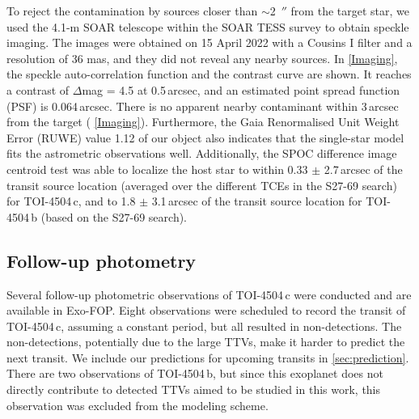 \documentclass[twocolumn,twocolappendix]{aastex631}
\let\orgautoref\autoref
\renewcommand{\autoref}
        {\def\equationautorefname{Eq.}%
         \def\figureautorefname{Fig.}%
         \def\sectionautorefname{Sect.}%
         \def\subsectionautorefname{Sect.}%
         \def\subsubsectionautorefname{Sect.}%
         \orgautoref}
\begin{document}
To reject the contamination by sources closer than $\sim$2 \,$''$ from the target star, we used the 4.1-m SOAR telescope \citep{SOAR} within the SOAR TESS survey \citep{SOAR_TESS} to obtain speckle imaging. The images were obtained on 15 April 2022 with a Cousins I filter and a resolution of 36 mas, and they did not reveal any nearby sources. In \autoref{Imaging}, the speckle auto-correlation function and the contrast curve are shown. It reaches a contrast of $\Delta$mag = 4.5 at 0.5\,arcsec, and an estimated point spread function (PSF) is 0.064\,arcsec. There is no apparent nearby contaminant within 3\,arcsec from the target (\autoref{Imaging}).
Furthermore, the Gaia Renormalised Unit Weight Error (RUWE) value 1.12 of our object also indicates that the single-star model fits the astrometric observations well.
Additionally, the SPOC difference image centroid test was able to localize the host star to within 0.33 $\pm$ 2.7\,arcsec of the transit source location (averaged over the different TCEs in the S27-69 search) for TOI-4504\,c, and to 1.8 $\pm$ 3.1\,arcsec of the transit source location for TOI-4504\,b (based on the S27-69 search).%

\subsection{Follow-up photometry}
Several follow-up photometric observations of TOI-4504\,c were conducted and are available in Exo-FOP. Eight observations were scheduled to record the transit of TOI-4504\,c, assuming a constant period, but all resulted in non-detections. The non-detections, potentially due to the large TTVs, make it harder to predict the next transit. We include our predictions for upcoming transits in \autoref{sec:prediction}.
There are two observations of TOI-4504\,b, but since this exoplanet does not directly contribute to detected TTVs aimed to be studied in this work, this observation was excluded from the modeling scheme.
\end{document}
